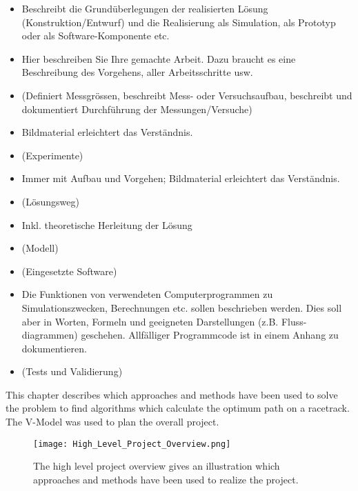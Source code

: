 \begin{itemize}
    \item Beschreibt die Grundüberlegungen der realisierten Lösung (Konstruktion/Entwurf) und die Realisierung als Simulation, als Prototyp oder als Software-Komponente etc.
    \item Hier beschreiben Sie Ihre gemachte Arbeit. Dazu braucht es eine Beschreibung des Vorgehens, aller Arbeitsschritte usw.
    \item (Definiert Messgrössen, beschreibt Mess- oder Versuchsaufbau, beschreibt und dokumentiert Durchführung der Messungen/Versuche)
    \item Bildmaterial erleichtert das Verständnis.
    \item (Experimente)
    \item Immer mit Aufbau und Vorgehen; Bildmaterial erleichtert das Verständnis.
    \item (Lösungsweg)
    \item Inkl. theoretische Herleitung der Lösung
    \item (Modell)
    \item (Eingesetzte Software)
    \item Die Funktionen von verwendeten Computerprogrammen zu Simulationszwecken, Berechnungen etc. sollen beschrieben werden. Dies soll aber in Worten, Formeln und geeigneten Darstellungen (z.B. Fluss- diagrammen) geschehen. Allfälliger Programmcode ist in einem Anhang zu dokumentieren.
    \item (Tests und Validierung)
\end{itemize}

This chapter describes which approaches and methods have been used to solve the problem to find algorithms which calculate the optimum path on a racetrack. The V-Model was used to plan the overall project.

\begin{figure}[H]
    \centering
    \texttt{[image: High\_Level\_Project\_Overview.png]}
    \caption{The high level project overview gives an illustration which approaches and methods have been used to realize the project.}
    \label{fig:High Level Project Overview}
\end{figure}

